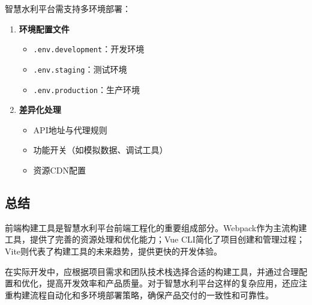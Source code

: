 智慧水利平台需支持多环境部署：

\begin{enumerate}
\def\labelenumi{\arabic{enumi}.}
\tightlist
\item
  \textbf{环境配置文件}

  \begin{itemize}
  \tightlist
  \item
    \passthrough{\lstinline!.env.development!}：开发环境
  \item
    \passthrough{\lstinline!.env.staging!}：测试环境
  \item
    \passthrough{\lstinline!.env.production!}：生产环境
  \end{itemize}
\item
  \textbf{差异化处理}

  \begin{itemize}
  \tightlist
  \item
    API地址与代理规则
  \item
    功能开关（如模拟数据、调试工具）
  \item
    资源CDN配置
  \end{itemize}
\end{enumerate}

\subsection{总结}\label{ux603bux7ed3}

前端构建工具是智慧水利平台前端工程化的重要组成部分。Webpack作为主流构建工具，提供了完善的资源处理和优化能力；Vue
CLI简化了项目创建和管理过程；Vite则代表了构建工具的未来趋势，提供更快的开发体验。

在实际开发中，应根据项目需求和团队技术栈选择合适的构建工具，并通过合理配置和优化，提高开发效率和产品质量。对于智慧水利平台这样的复杂应用，还应注重构建流程自动化和多环境部署策略，确保产品交付的一致性和可靠性。
